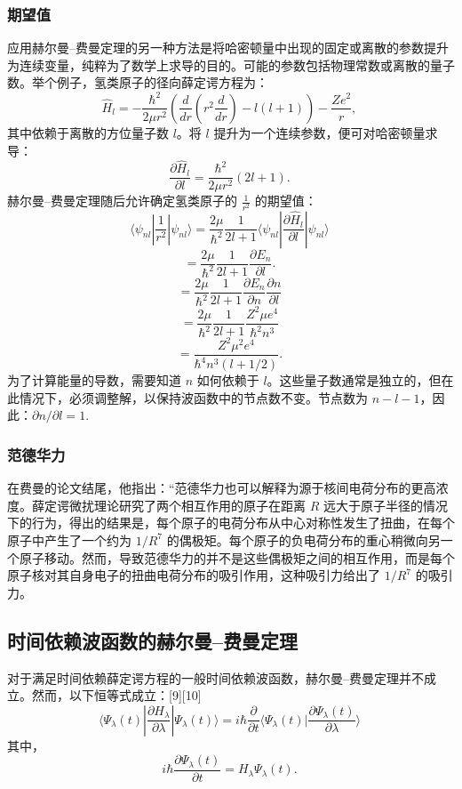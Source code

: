 \subsubsection{期望值}
应用赫尔曼–费曼定理的另一种方法是将哈密顿量中出现的固定或离散的参数提升为连续变量，纯粹为了数学上求导的目的。可能的参数包括物理常数或离散的量子数。举个例子，氢类原子的径向薛定谔方程为：
\[
\hat{H}_l = - \frac{\hbar^2}{2\mu r^2} \left( \frac{d}{dr} \left( r^2 \frac{d}{dr} \right) - l(l+1) \right) - \frac{Ze^2}{r},~
\]
其中依赖于离散的方位量子数 \(l\)。将 \(l\) 提升为一个连续参数，便可对哈密顿量求导：
\[
\frac{\partial \hat{H}_l}{\partial l} = \frac{\hbar^2}{2\mu r^2}(2l+1).~
\]
赫尔曼–费曼定理随后允许确定氢类原子的 \(\frac{1}{r^2}\) 的期望值：
\[
\langle \psi_{nl} \left| \frac{1}{r^2} \right| \psi_{nl} \rangle = \frac{2\mu}{\hbar^2} \frac{1}{2l+1} \langle \psi_{nl} \left| \frac{\partial \hat{H}_l}{\partial l} \right| \psi_{nl} \rangle ~
\]
\[=\frac{2\mu}{\hbar^2} \frac{1}{2l+1} \frac{\partial E_n}{\partial l}.~\]
\[
= \frac{2\mu}{\hbar^2} \frac{1}{2l+1} \frac{\partial E_n}{\partial n} \frac{\partial n}{\partial l}~
\]
\[
= \frac{2\mu}{\hbar^2} \frac{1}{2l+1} \frac{Z^2 \mu e^4}{\hbar^2 n^3}~
\]
\[
= \frac{Z^2 \mu^2 e^4}{\hbar^4 n^3 (l + 1/2)}.~
\]
为了计算能量的导数，需要知道 \(n\) 如何依赖于 \(l\)。这些量子数通常是独立的，但在此情况下，必须调整解，以保持波函数中的节点数不变。节点数为 \(n - l - 1\)，因此：\(\partial n/\partial l = 1.\)
\subsubsection{范德华力}
在费曼的论文结尾，他指出：“范德华力也可以解释为源于核间电荷分布的更高浓度。薛定谔微扰理论研究了两个相互作用的原子在距离 \(R\) 远大于原子半径的情况下的行为，得出的结果是，每个原子的电荷分布从中心对称性发生了扭曲，在每个原子中产生了一个约为 \(1/R^7\) 的偶极矩。每个原子的负电荷分布的重心稍微向另一个原子移动。然而，导致范德华力的并不是这些偶极矩之间的相互作用，而是每个原子核对其自身电子的扭曲电荷分布的吸引作用，这种吸引力给出了 \(1/R^7\) 的吸引力。
\subsection{时间依赖波函数的赫尔曼–费曼定理}
对于满足时间依赖薛定谔方程的一般时间依赖波函数，赫尔曼–费曼定理并不成立。然而，以下恒等式成立：[9][10]
\[
\langle \Psi_{\lambda}(t) | \frac{\partial H_{\lambda}}{\partial \lambda} | \Psi_{\lambda}(t) \rangle = i \hbar \frac{\partial}{\partial t} \langle \Psi_{\lambda}(t) | \frac{\partial \Psi_{\lambda}(t)}{\partial \lambda} \rangle~
\]
其中，
\[
i \hbar \frac{\partial \Psi_{\lambda}(t)}{\partial t} = H_{\lambda} \Psi_{\lambda}(t).~
\]
